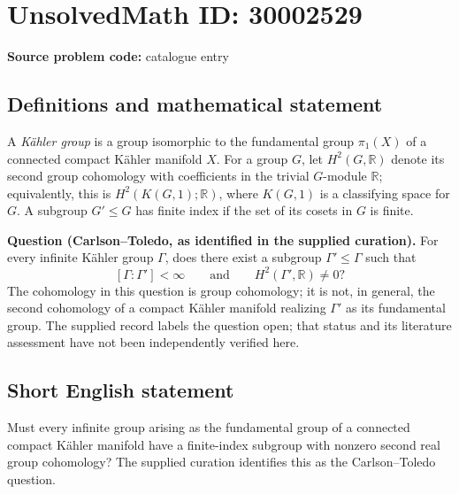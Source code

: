 \documentclass[11pt]{article}
\newcommand{\R}{\mathbb{R}}
\begin{document}
\section*{UnsolvedMath ID: 30002529}
\textbf{Source problem code:} catalogue entry
\subsection{Definitions and mathematical statement}
A \emph{K\"ahler group} is a group isomorphic to the fundamental group \(\pi_1(X)\) of a connected compact K\"ahler manifold \(X\). For a group \(G\), let \(H^2(G,\R)\) denote its second group cohomology with coefficients in the trivial \(G\)-module \(\R\); equivalently, this is \(H^2(K(G,1);\R)\), where \(K(G,1)\) is a classifying space for \(G\). A subgroup \(G'\leq G\) has finite index if the set of its cosets in \(G\) is finite.

\textbf{Question (Carlson--Toledo, as identified in the supplied curation).} For every infinite K\"ahler group \(\Gamma\), does there exist a subgroup \(\Gamma'\leq\Gamma\) such that
\[
[\Gamma:\Gamma']<\infty
\qquad\text{and}\qquad
H^2(\Gamma',\R)\neq 0?
\]
The cohomology in this question is group cohomology; it is not, in general, the second cohomology of a compact K\"ahler manifold realizing \(\Gamma'\) as its fundamental group. The supplied record labels the question open; that status and its literature assessment have not been independently verified here.
\subsection{Short English statement}
Must every infinite group arising as the fundamental group of a connected compact K\"ahler manifold have a finite-index subgroup with nonzero second real group cohomology? The supplied curation identifies this as the Carlson--Toledo question.
\end{document}
